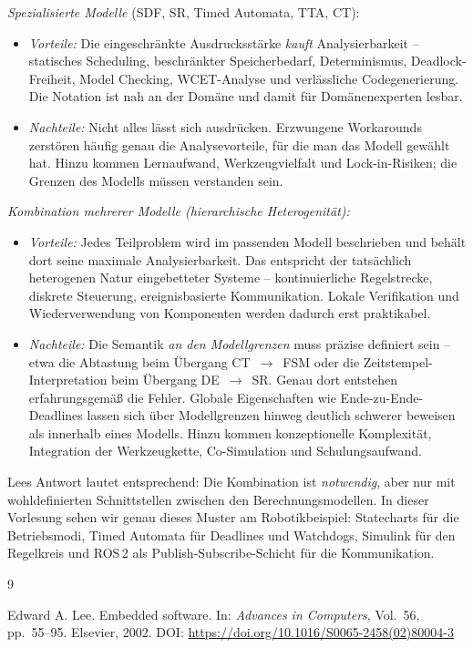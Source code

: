 \begin{loesung}
\emph{Spezialisierte Modelle} (SDF, SR, Timed Automata, TTA, CT):
\begin{itemize}
    \item \emph{Vorteile:} Die eingeschränkte Ausdrucksstärke \emph{kauft} Analysierbarkeit --
          statisches Scheduling, beschränkter Speicherbedarf, Determinismus, Deadlock-Freiheit,
          Model Checking, WCET-Analyse und verlässliche Codegenerierung. Die Notation ist nah an der
          Domäne und damit für Domänenexperten lesbar.
    \item \emph{Nachteile:} Nicht alles lässt sich ausdrücken. Erzwungene Workarounds zerstören
          häufig genau die Analysevorteile, für die man das Modell gewählt hat. Hinzu kommen
          Lernaufwand, Werkzeugvielfalt und Lock-in-Risiken; die Grenzen des Modells müssen verstanden
          sein.
\end{itemize}

\emph{Kombination mehrerer Modelle (hierarchische Heterogenität):}
\begin{itemize}
    \item \emph{Vorteile:} Jedes Teilproblem wird im passenden Modell beschrieben und behält dort
          seine maximale Analysierbarkeit. Das entspricht der tatsächlich heterogenen Natur
          eingebetteter Systeme -- kontinuierliche Regelstrecke, diskrete Steuerung,
          ereignisbasierte Kommunikation. Lokale Verifikation und Wiederverwendung von Komponenten
          werden dadurch erst praktikabel.
    \item \emph{Nachteile:} Die Semantik \emph{an den Modellgrenzen} muss präzise definiert sein --
          etwa die Abtastung beim Übergang CT~$\to$~FSM oder die Zeitstempel-Interpretation beim
          Übergang DE~$\to$~SR. Genau dort entstehen erfahrungsgemäß die Fehler. Globale
          Eigenschaften wie Ende-zu-Ende-Deadlines lassen sich über Modellgrenzen hinweg deutlich
          schwerer beweisen als innerhalb eines Modells. Hinzu kommen konzeptionelle Komplexität,
          Integration der Werkzeugkette, Co-Simulation und Schulungsaufwand.
\end{itemize}

Lees Antwort lautet entsprechend: Die Kombination ist \emph{notwendig}, aber nur mit wohldefinierten
Schnittstellen zwischen den Berechnungsmodellen. In dieser Vorlesung sehen wir genau dieses Muster
am Robotikbeispiel: Statecharts für die Betriebsmodi, Timed Automata für Deadlines und Watchdogs,
Simulink für den Regelkreis und ROS\,2 als Publish-Subscribe-Schicht für die Kommunikation.
\end{loesung}

\begin{thebibliography}{9}

Edward A. Lee.
\newblock Embedded software.
\newblock In: {\em Advances in Computers}, Vol.~56, pp.~55--95.
\newblock Elsevier, 2002.
\newblock DOI: \url{https://doi.org/10.1016/S0065-2458(02)80004-3}

\end{thebibliography}


